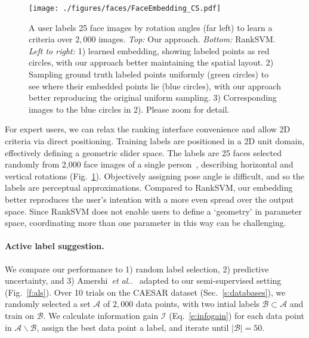 \documentclass{article}
\makeatletter
\newcommand{\calA}{\mathcal{A}}
\newcommand{\calB}{\mathcal{B}}
\newcommand{\calI}{\mathcal{I}}
\DeclareRobustCommand\onedot{\futurelet\@let@token\@onedot}
\def\@onedot{\ifx\@let@token.\else.\null\fi\xspace}
\def\etal{\emph{et al}\onedot}
\makeatother
\begin{document}
\begin{figure}[t]
	\centering
	\texttt{[image: ./figures/faces/FaceEmbedding\_CS.pdf]}
	\caption{A user labels 25 face images by rotation angles (far left) to learn a criteria over $2,000$ images. \emph{Top:} Our approach. \emph{Bottom:} RankSVM. \emph{Left to right:} 1) learned embedding, showing labeled points as red circles, with our approach better maintaining the spatial layout. 2) Sampling ground truth labeled points uniformly (green circles) to see where their embedded points lie (blue circles), with our approach better reproducing the original uniform sampling. 3) Corresponding images to the blue circles in 2). Please zoom for detail.}
\label{fig:facepose}
\end{figure}

For expert users, we can relax the ranking interface convenience and allow 2D criteria via direct positioning. Training labels are positioned in a 2D unit domain, effectively defining a geometric slider space. The labels are 25 faces selected randomly from 2,000 face images of a single person~\cite{VerVla06}, describing horizontal and vertical rotations (Fig.~\ref{fig:facepose}). Objectively assigning pose angle is difficult, and so the labels are perceptual approximations. Compared to RankSVM, our embedding better reproduces the user's intention with a more even spread over the output space. Since RankSVM does not enable users to define a `geometry' in parameter space, coordinating more than one parameter in this way can be challenging.

\paragraph{Active label suggestion.} 
\label{sec:expactivelearning}

\begin{figure}[t]
\centering
{}
\end{figure}

We compare our performance to 1) random label selection, 2) predictive uncertainty, and 3) Amershi~\etal~\cite{AmeFogKap11} adapted to our semi-supervised setting (Fig.~\ref{f:als}). Over 10 trials on the CAESAR dataset (Sec.~\ref{s:databases}), we randomly selected a set $\calA$ of $2,000$ data points, with two intial labels $\calB\subset \calA$ and train on $\calB$. We calculate information gain $\calI$ (Eq.~\ref{e:infogain}) for each data point in $\calA\backslash\calB$, assign the best data point a label, and iterate until $|\calB| = 50$. 
\end{document}
